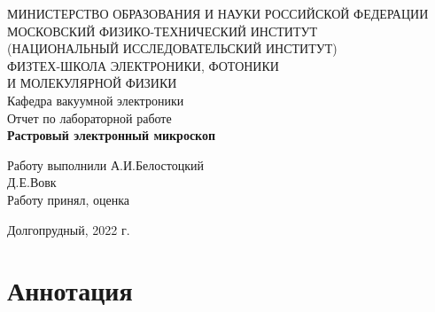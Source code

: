 \documentclass[a4paper,12pt]{article}
\begin{document}
 

\begin{titlepage}
	\begin{center}
		\large 	МИНИСТЕРСТВО ОБРАЗОВАНИЯ И НАУКИ РОССИЙСКОЙ ФЕДЕРАЦИИ\\
				МОСКОВСКИЙ ФИЗИКО-ТЕХНИЧЕСКИЙ ИНСТИТУТ \\
				(НАЦИОНАЛЬНЫЙ ИССЛЕДОВАТЕЛЬСКИЙ ИНСТИТУТ)\\ 
				ФИЗТЕХ-ШКОЛА ЭЛЕКТРОНИКИ, ФОТОНИКИ \\
				И МОЛЕКУЛЯРНОЙ ФИЗИКИ \\
		
		
		\vspace{4.0 cm}
		\LARGE{Кафедра вакуумной электроники \\ 
		Отчет по лабораторной работе} \\ 
		\LARGE \textbf{Растровый электронный микроскоп} \\
	\end{center}
	\vspace{3 cm} \large

	\begin{flushleft}
		Работу выполнили \hspace{5.5cm}  \underline{\hspace{3cm}} А.И.Белостоцкий \\	
		\hspace{9.8cm}  \underline{\hspace{3cm}} Д.Е.Вовк \\
		

		\vspace{2cm}
		Работу принял, оценка \hspace{4.5cm} \underline{\hspace{3cm}}
	\end{flushleft}
	
	
	\vfill

	\begin{center}
	Долгопрудный, 2022 г.
	\end{center}
\end{titlepage}                                                                      

\tableofcontents

\newpage

\section{Аннотация}
\end{document}
